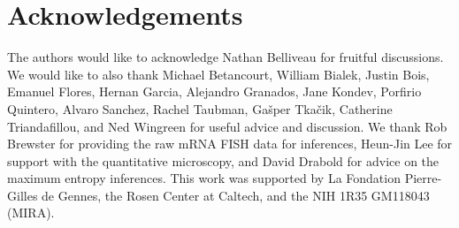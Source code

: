 \section*{Acknowledgements}

The authors would like to acknowledge Nathan Belliveau for fruitful
discussions. We would like to also thank Michael Betancourt, William Bialek,
Justin Bois, Emanuel Flores, Hernan Garcia, Alejandro Granados, Jane Kondev,
Porfirio Quintero, Alvaro Sanchez, Rachel Taubman, Gašper Tkačik, Catherine
Triandafillou, and Ned Wingreen for useful advice and discussion. We thank Rob
Brewster for providing the raw mRNA FISH data for inferences, Heun-Jin Lee for
support with the quantitative microscopy, and David Drabold for advice on the
maximum entropy inferences. This work was supported by La Fondation
Pierre-Gilles de Gennes, the Rosen Center at Caltech, and the NIH 1R35 GM118043
(MIRA).
